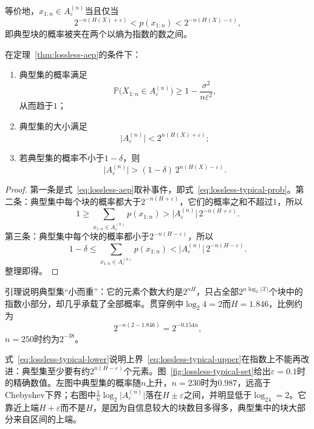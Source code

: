 等价地，$x_{1:n}\in A_{\varepsilon}^{(n)}$当且仅当
\[
 2^{-n(H(X)+\varepsilon)}<p(x_{1:n})<2^{-n(H(X)-\varepsilon)},
\]
即典型块的概率被夹在两个以熵为指数的数之间。

\begin{lemma}[典型集的性质]
\label{lem:lossless-typical-properties}
在定理~\ref{thm:lossless-aep}的条件下：
\begin{enumerate}
 \item 典型集的概率满足
 \begin{equation}
  \mathbb{P}\bigl(X_{1:n}\in A_{\varepsilon}^{(n)}\bigr)\geq1-\frac{\sigma^2}{n\varepsilon^2},
  \label{eq:lossless-typical-prob}
 \end{equation}
 从而趋于$1$；
 \item 典型集的大小满足
 \begin{equation}
  \lvert A_{\varepsilon}^{(n)}\rvert<2^{n(H(X)+\varepsilon)};
  \label{eq:lossless-typical-upper}
 \end{equation}
 \item 若典型集的概率不小于$1-\delta$，则
 \begin{equation}
  \lvert A_{\varepsilon}^{(n)}\rvert>(1-\delta)\,2^{n(H(X)-\varepsilon)}.
  \label{eq:lossless-typical-lower}
 \end{equation}
\end{enumerate}
\end{lemma}

\begin{proof}
第一条是式~\eqref{eq:lossless-aep}取补事件，即式~\eqref{eq:lossless-typical-prob}。第二条：典型集中每个块的概率都大于$2^{-n(H+\varepsilon)}$，它们的概率之和不超过$1$，所以
\[
 1\geq\sum_{x_{1:n}\in A_{\varepsilon}^{(n)}}p(x_{1:n})>\lvert A_{\varepsilon}^{(n)}\rvert\,2^{-n(H+\varepsilon)} .
\]
第三条：典型集中每个块的概率都小于$2^{-n(H-\varepsilon)}$，所以
\[
 1-\delta\leq\sum_{x_{1:n}\in A_{\varepsilon}^{(n)}}p(x_{1:n})<\lvert A_{\varepsilon}^{(n)}\rvert\,2^{-n(H-\varepsilon)} .
\]
整理即得。
\end{proof}

引理说明典型集“小而重”：它的元素个数大约是$2^{nH}$，只占全部$2^{n\log_2\lvert\mathcal{X}\rvert}$个块中的指数小部分，却几乎承载了全部概率。贯穿例中$\log_2 4=2$而$H=1.846$，比例约为
\[
 2^{-n(2-1.846)}=2^{-0.154n},
\]
$n=250$时约为$2^{-38}$。

式~\eqref{eq:lossless-typical-lower}说明上界~\eqref{eq:lossless-typical-upper}在指数上不能再改进：典型集至少要有约$2^{n(H-\varepsilon)}$个元素。图~\ref{fig:lossless-typical-set}给出$\varepsilon=0.1$时的精确数值。左图中典型集的概率随$n$上升，$n=230$时为$0.987$，远高于Chebyshev下界；右图中$\frac1n\log_2\lvert A_{\varepsilon}^{(n)}\rvert$落在$H\pm\varepsilon$之间，并明显低于$\log_24=2$。它靠近上端$H+\varepsilon$而不是$H$，是因为自信息较大的块数目多得多，典型集中的块大部分来自区间的上端。

